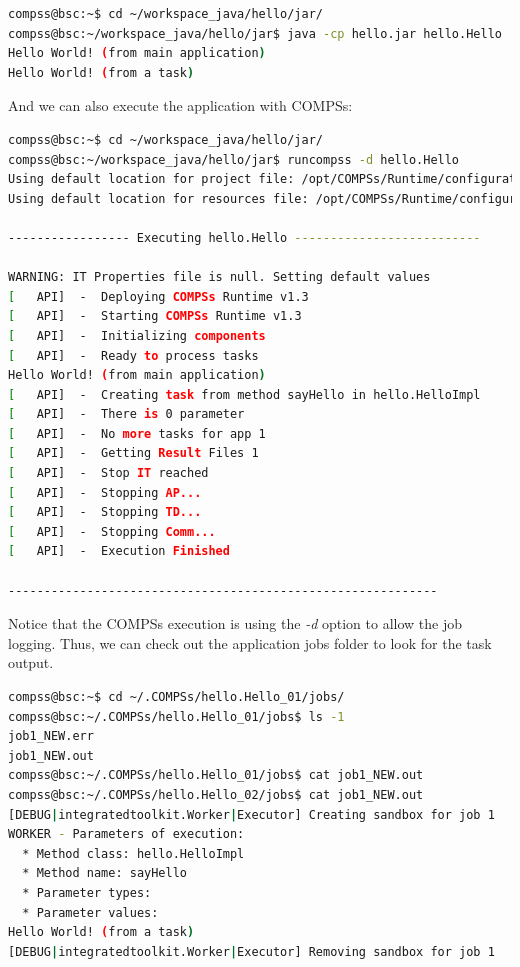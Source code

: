 \begin{lstlisting}[language=bash]
compss@bsc:~$ cd ~/workspace_java/hello/jar/
compss@bsc:~/workspace_java/hello/jar$ java -cp hello.jar hello.Hello 
Hello World! (from main application)
Hello World! (from a task)
\end{lstlisting}

And we can also execute the application with COMPSs:

\begin{lstlisting}[language=bash]
compss@bsc:~$ cd ~/workspace_java/hello/jar/
compss@bsc:~/workspace_java/hello/jar$ runcompss -d hello.Hello
Using default location for project file: /opt/COMPSs/Runtime/configuration/xml/projects/project.xml
Using default location for resources file: /opt/COMPSs/Runtime/configuration/xml/resources/resources.xml

----------------- Executing hello.Hello --------------------------

WARNING: IT Properties file is null. Setting default values
[   API]  -  Deploying COMPSs Runtime v1.3
[   API]  -  Starting COMPSs Runtime v1.3
[   API]  -  Initializing components
[   API]  -  Ready to process tasks
Hello World! (from main application)
[   API]  -  Creating task from method sayHello in hello.HelloImpl
[   API]  -  There is 0 parameter
[   API]  -  No more tasks for app 1
[   API]  -  Getting Result Files 1
[   API]  -  Stop IT reached
[   API]  -  Stopping AP...
[   API]  -  Stopping TD...
[   API]  -  Stopping Comm...
[   API]  -  Execution Finished

------------------------------------------------------------
\end{lstlisting}

Notice that the COMPSs execution is using the \textit{-d} option to allow the job logging. Thus, we can check out the application jobs folder to look for
the task output.

\begin{lstlisting}[language=bash]
compss@bsc:~$ cd ~/.COMPSs/hello.Hello_01/jobs/
compss@bsc:~/.COMPSs/hello.Hello_01/jobs$ ls -1
job1_NEW.err
job1_NEW.out
compss@bsc:~/.COMPSs/hello.Hello_01/jobs$ cat job1_NEW.out
compss@bsc:~/.COMPSs/hello.Hello_02/jobs$ cat job1_NEW.out 
[DEBUG|integratedtoolkit.Worker|Executor] Creating sandbox for job 1
WORKER - Parameters of execution:
  * Method class: hello.HelloImpl
  * Method name: sayHello
  * Parameter types:
  * Parameter values:
Hello World! (from a task)
[DEBUG|integratedtoolkit.Worker|Executor] Removing sandbox for job 1
\end{lstlisting}

